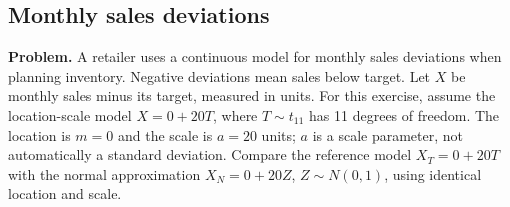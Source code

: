 
\clearpage
\subsection{Monthly sales deviations}
\label{c9-d4}
\textbf{Problem.} A retailer uses a continuous model for monthly sales deviations when planning inventory. Negative deviations mean sales below target. Let $X$ be monthly sales minus its target, measured in units. For this exercise, assume the location-scale model $X=0+20T$, where $T\sim t_{11}$ has 11 degrees of freedom. The location is $m=0$ and the scale is $a=20$ units; $a$ is a scale parameter, not automatically a standard deviation. Compare the reference model $X_T=0+20T$ with the normal approximation $X_N=0+20Z$, $Z\sim N(0,1)$, using identical location and scale.
